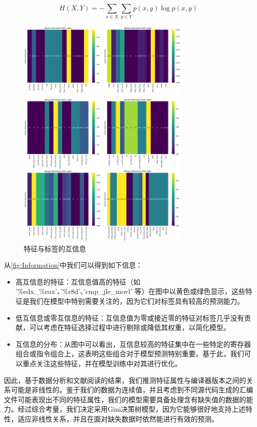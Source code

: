 \begin{equation}
	H(X, Y) = -\sum_{x \in X} \sum_{y \in Y} p(x, y) \log p(x, y)
	\label{eq:joint_entropy}
\end{equation}
\begin{figure}
	\centering
	\includegraphics[width=0.75\textwidth]{figures/Information.png}
	\caption{特征与标签的互信息}
	\label{fig:Information}
\end{figure}
从\autoref{fig:Information}中我们可以得到如下信息：
\begin{itemize}
	\item 高互信息的特征：互信息值高的特征（如 '\%edx\_\%eax'、'\%r8d'、'cmp\_jle\_movl' 等）在图中以黄色或绿色显示，这些特征是我们在模型中特别需要关注的，因为它们对标签具有较高的预测能力。
	\item 低互信息或零互信息的特征：互信息值为零或接近零的特征对标签几乎没有贡献，可以考虑在特征选择过程中进行剔除或降低其权重，以简化模型。
	\item 互信息的分布：从图中可以看出，互信息较高的特征集中在一些特定的寄存器组合或指令组合上，这表明这些组合对于模型预测特别重要。基于此，我们可以重点关注这些特征，并在模型训练中对其进行优化。
\end{itemize}

因此，基于数据分析和文献阅读的结果，我们推测特征属性与编译器版本之间的关系可能是非线性的。鉴于我们的数据为连续值，并且考虑到不同源代码生成的汇编文件可能表现出不同的特征属性，我们的模型需要具备处理含有缺失值的数据的能力。经过综合考量，我们决定采用Gini决策树模型，因为它能够很好地支持上述特性，适应非线性关系，并且在面对缺失数据时依然能进行有效的预测。
\vspace*{1cm}
